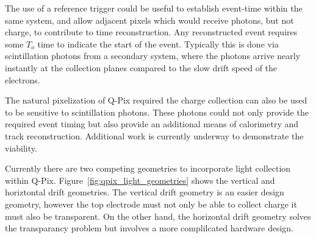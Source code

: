 The use of a reference trigger could be useful to establish event-time within the same system, and allow adjacent pixels which would receive photons, but not charge, to contribute to time reconstruction.
Any reconstructed event requires some $T_{o}$ time to indicate the start of the event.
Typically this is done via scintillation photons from a secondary system, where the photons arrive nearly instantly at the collection planes compared to the slow drift speed of the electrons.

The natural pixelization of Q-Pix required the charge collection can also be used to be sensitive to scintillation photons.
These photons could not only provide the required event timing but also provide an additional means of calorimetry and track reconstruction.
Additional work is currently underway to demonstrate the viability.

Currently there are two competing geometries to incorporate light collection within Q-Pix.
Figure~\ref{fig:qpix_light_geometries} shows the vertical and horiztontal drift geometries.
The vertical drift geometry is an easier design geometry, however the top electrode must not only be able to collect charge it must also be transparent. 
On the other hand, the horizontal drift geometry solves the transparancy problem but involves a more complilcated hardware design. 

